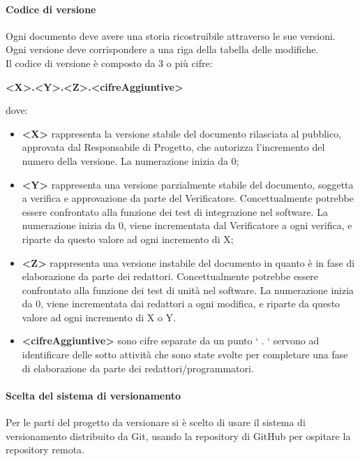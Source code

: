 			\paragraph{Codice di versione}
				Ogni documento deve avere una storia ricostruibile attraverso le sue versioni.  \\
				Ogni versione deve corrispondere a una riga della tabella delle modifiche. \\
				Il codice di versione è composto da 3 o più cifre: \\
				\begin{center}
					\textbf{<X>.<Y>.<Z>.<cifreAggiuntive>}
				\end{center}
				dove:
				\begin{itemize}
					\item\textbf{<X>} rappresenta la versione stabile del documento rilasciata al pubblico, approvata dal Responsabile di Progetto, che autorizza l’incremento del numero della versione. La numerazione inizia da 0;
					\item\textbf{<Y>} rappresenta una versione parzialmente stabile del documento, soggetta a verifica e approvazione da parte del Verificatore. Concettualmente potrebbe essere confrontato alla funzione dei test di integrazione nel software. La numerazione inizia da 0, viene incrementata dal Verificatore a ogni verifica, e riparte da questo valore ad ogni incremento di X;
					\item\textbf{<Z>} rappresenta una versione instabile del documento in quanto è in fase di elaborazione da parte dei redattori. Concettualmente potrebbe essere confrontato alla funzione dei test di unità nel software. La numerazione inizia da 0, viene incrementata dai redattori a ogni modifica, e riparte da questo valore ad ogni incremento di X o Y.
					\item\textbf{<cifreAggiuntive>} sono cifre separate da un punto ‘ . ‘ servono ad identificare delle sotto attività che sono state svolte per completare una fase di elaborazione da parte dei redattori/programmatori.
				\end{itemize}
			\paragraph{Scelta del sistema di versionamento}
				Per le parti del progetto da versionare si è scelto di usare il sistema di versionamento distribuito da Git, usando la repository di GitHub per ospitare la repository remota.
